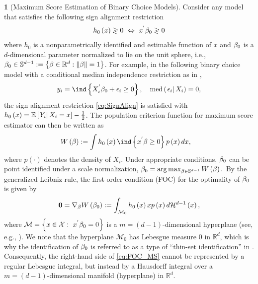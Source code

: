 \documentclass[12pt,american]{article}
\theoremstyle{definition}
\newtheorem{example}{\protect\examplename}
\theoremstyle{plain}
\theoremstyle{definition}
\theoremstyle{plain}
\theoremstyle{plain}
\theoremstyle{plain}
\theoremstyle{plain}
\theoremstyle{plain}
\newcommand{\R}{\mathbb{R}}
\newcommand{\E}{\mathbb{E}}
\newcommand{\norm}[1]{\left\| #1 \right\|}
\providecommand{\examplename}{Example}
\providecommand{\examplename}{Example}
\begin{document}
\begin{example}[Maximum Score Estimation of Binary Choice Models]
  \label{exa: MaxScore} Consider any model that satisfies the following
  sign alignment restriction
  \begin{equation}
    h_{0}\left(x\right)\gtrless0\ \iff\ x^{'}\b_{0}\gtrless0\label{eq:SignAlign}
  \end{equation}
  where $h_{0}$ is a nonparametrically identified and estimable function
  of $x$ and $\beta_{0}$ is a $d$-dimensional parameter normalized to
  lie on the unit sphere, i.e., $\b_{0}\in\S^{d-1}:=\left\{ \b\in\R^{d}:\norm{\b}=1\right\} $.
  For example, in the following binary choice model with a conditional
  median independence restriction as in \citet*{manski1975maximum},
  \[
    y_{i}=\ind\left\{ X_{i}^{'}\b_{0}+\e_{i}\geq0\right\} ,\quad\text{med}\left(\rest{\e_{i}}X_{i}\right)=0,
  \]
  the sign alignment restriction \eqref{eq:SignAlign} is satisfied
  with $h_{0}\left(x\right)=\E\left[\rest{Y_{i}}X_{i}=x\right]-\frac{1}{2}$.
  The population criterion function for maximum score estimator can
  then be written as
  \begin{align}
    W\left(\b\right) & :=\int h_{0}\left(x\right)\ind\left\{ x^{'}\b\geq0\right\} p\left(x\right)dx,\label{eq:Q_MS}
  \end{align}
  where $p\left(\cdot\right)$ denotes the density of $X_{i}$. Under
  appropriate conditions, $\beta_{0}$ can be point identified under a scale
  normalization,
  $\beta_{0}=\arg\max_{\beta\in\mathbb{S}^{d-1}}W\left(\beta\right).$
  By the generalized Leibniz rule, the first order condition (FOC) for the optimality of $\beta_{0}$ is given by
  \begin{equation}
    {\bf 0}=\nabla_{\beta}W\left(\beta_{0}\right):=\int_{\mathcal{M}_0} h_{0}\left(x\right)xp\left(x\right)d{\cal H}^{d-1}\left(x\right),\label{eq:FOC_MS}
  \end{equation}
  where $\mathcal{M}=\left\{x\in\mathcal{X}:~ x^{'}\beta_{0}=0\right\}$ is a $m=\left(d-1\right)$-dimensional
  hyperplane (see, e.g.,  \citet*{kim1990cube}). We note that the hyperplane $\mathcal{M}_0$ has Lebesgue measure $0$ in $\R^{d}$, which is why the identification of $\beta_{0}$ is referred
  to as a type of ``thin-set identification'' in \citet*{khan2010irregular}.
  Consequently, the right-hand side of \eqref{eq:FOC_MS} cannot
  be represented by a regular Lebesgue integral, but instead by a Hausdorff
  integral over a $m=\left(d-1\right)$-dimensional manifold (hyperplane) in $\R^{d}$.
\end{example}
\end{document}
